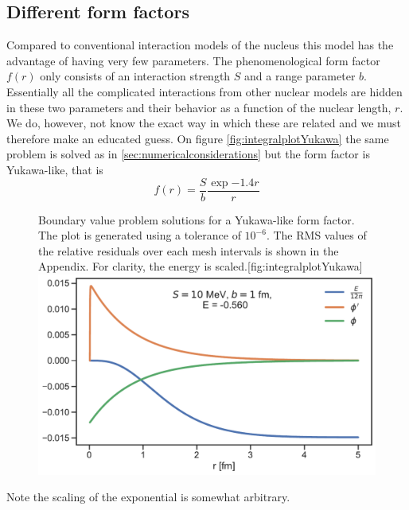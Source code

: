 \subsection{Different form factors}
Compared to conventional interaction models of the nucleus this model has the advantage of having very few parameters. The phenomenological form factor $f(r)$ only consists of an interaction strength $S$ and a range parameter $b$. Essentially all the complicated interactions from other nuclear models are hidden in these two parameters and their behavior as a function of the nuclear length, $r$. We do, however, not know the exact way in which these are related and we must therefore make an educated guess. 
On figure \ref{fig:integralplotYukawa} the same problem is solved as in \ref{sec:numericalconsiderations} but the form factor is Yukawa-like, that is
\begin{equation}
	f(r) = \frac{S}{b}\frac{\exp{-1.4r}}{r}
\end{equation}
\begin{figure}[H]
	\begin{sidecaption}{Boundary value problem solutions for a Yukawa-like form factor. The plot is generated using a tolerance of $10^{-6}$. The RMS values of the relative residuals over each mesh intervals is shown in the Appendix. For clarity, the energy is scaled.}[fig:integralplotYukawa]
		\includegraphics[width=\linewidth]{Figures/yukawa.pdf}
	\end{sidecaption}
\end{figure}
Note the scaling of the exponential is somewhat arbitrary.




